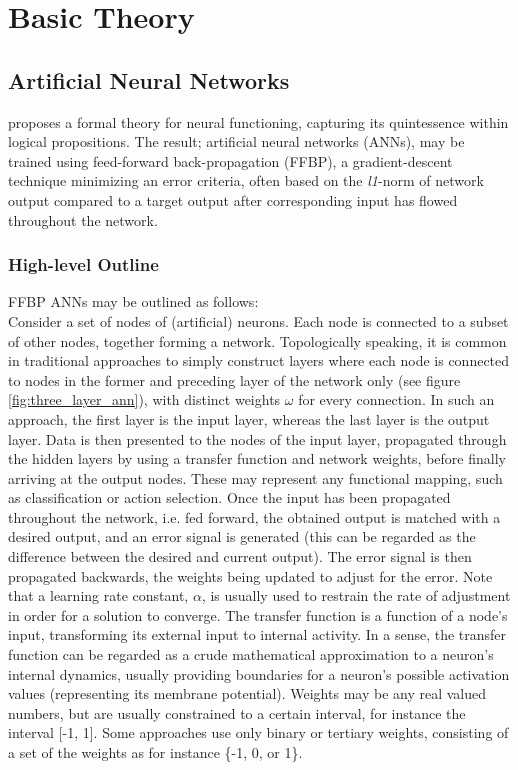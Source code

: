 
\chapter{Basic Theory}

\section{Artificial Neural Networks}

\cite{McCulloch1943} proposes a formal theory for neural functioning, capturing its quintessence within logical propositions. 
The result; artificial neural networks (ANNs), may be trained using feed-forward back-propagation (FFBP), a gradient-descent technique minimizing an error criteria, often based on the \textit{l1}-norm of network output compared to a target output after corresponding input has flowed throughout the network.

\subsection{High-level Outline}
FFBP ANNs may be outlined as follows:
\\
Consider a set of nodes of (artificial) neurons. Each node is connected to a subset of other nodes, together forming a network. Topologically speaking, it is common in traditional approaches to simply construct layers where each node is connected to nodes in the former and preceding layer of the network only (see figure \ref{fig:three_layer_ann}), with distinct weights $\omega$ for every connection. In such an approach, the first layer is the input layer, whereas the last layer is the output layer. Data is then presented to the nodes of the input layer, propagated through the hidden layers by using a transfer function and network weights, before finally arriving at the output nodes. These may represent any functional mapping, such as classification or action selection. Once the input has been propagated throughout the network, i.e. fed forward, the obtained output is matched with a desired output, and an error signal is generated (this can be regarded as the difference between the desired and current output). The error signal is then propagated backwards, the weights being updated to adjust for the error. Note that a learning rate constant, $\alpha$, is usually used to restrain the rate of adjustment in order for a solution to converge.
The transfer function is a function of a node's input, transforming its external input to internal activity. In a sense, the transfer function can be regarded as a crude mathematical approximation to a neuron's internal dynamics, usually providing boundaries for a neuron's possible activation values (representing its membrane potential). Weights may be any real valued numbers, but are usually constrained to a certain interval, for instance the interval [-1, 1]. Some approaches use only binary or tertiary weights, consisting of a set of the weights as for instance \{-1, 0, or 1\}.


